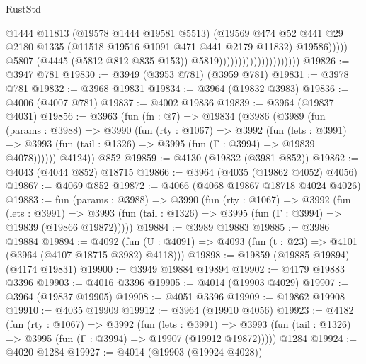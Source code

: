 \begin{lexlean}{RustStd}
\begin{coremodule}
                                                      @1444
                                                      @11813
                                                      (@19578 @1444 @19581 @5513)
                                                      (@19569
                                                        @474
                                                        @52
                                                        @441
                                                        @29
                                                        @2180
                                                        @1335
                                                        (@11518 @19516 @1091 @471 @441 @2179 @11832)
                                                        @19586)))))
                                              @5807
                                              (@4445 (@5812 @812 @835 @153))
                                              @5819)))))))))))))))))))))
@19826 := @3947 @781
@19830 := @3949 (@3953 @781) (@3959 @781)
@19831 := @3978 @781
@19832 := @3968 @19831
@19834 := @3964 (@19832 @3983)
@19836 := @4006 (@4007 @781)
@19837 := @4002 @19836
@19839 := @3964 (@19837 @4031)
@19856 := @3963
    (fun (fn : @7) =>
    @19834
      (@3986
        (@3989
          (fun (params : @3988) =>
          @3990
            (fun (rty : @1067) =>
            @3992
              (fun (lets : @3991) =>
              @3993 (fun (tail : @1326) => @3995 (fun (Γ : @3994) => @19839 @4078))))))
        @4124))
    @852
@19859 := @4130 (@19832 (@3981 @852))
@19862 := @4043 (@4044 @852) @18715
@19866 := @3964 (@4035 (@19862 @4052) @4056)
@19867 := @4069 @852
@19872 := @4066 (@4068 @19867 @18718 @4024 @4026)
@19883 := fun (params : @3988) =>
  @3990
    (fun (rty : @1067) =>
    @3992
      (fun (lets : @3991) =>
      @3993 (fun (tail : @1326) => @3995 (fun (Γ : @3994) => @19839 (@19866 @19872)))))
@19884 := @3989 @19883
@19885 := @3986 @19884
@19894 := @4092
    (fun (U : @4091) => @4093 (fun (t : @23) => @4101 (@3964 (@4107 @18715 @3982) @4118)))
@19898 := @19859 (@19885 @19894) (@4174 @19831)
@19900 := @3949 @19884 @19894
@19902 := @4179 @19883 @3396
@19903 := @4016 @3396
@19905 := @4014 (@19903 @4029)
@19907 := @3964 (@19837 @19905)
@19908 := @4051 @3396
@19909 := @19862 @19908
@19910 := @4035 @19909
@19912 := @3964 (@19910 @4056)
@19923 := @4182
    (fun (rty : @1067) =>
    @3992
      (fun (lets : @3991) =>
      @3993 (fun (tail : @1326) => @3995 (fun (Γ : @3994) => @19907 (@19912 @19872)))))
    @1284
@19924 := @4020 @1284
@19927 := @4014 (@19903 (@19924 @4028))

\end{coremodule}
\end{lexlean}
